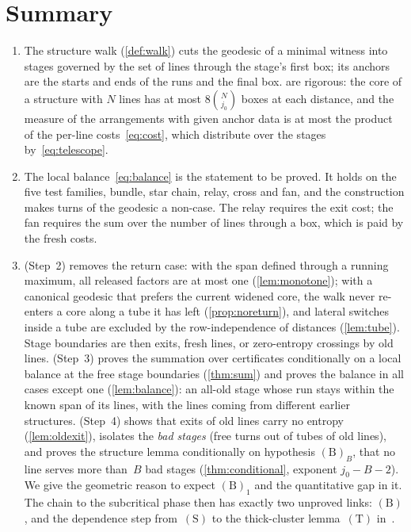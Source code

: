 \documentclass[11pt,letterpaper]{article}
\begin{document}
\section{Summary}
\label{sec:summary}

\begin{enumerate}
  \item The structure walk (\cref{def:walk}) cuts the geodesic of a minimal witness into stages governed by the set of lines through the stage's first box; its anchors are the starts and ends of the runs and the final box.  are rigorous: the core of a structure with $N$ lines has at most $8\binom N{j_0}$ boxes at each distance, and the measure of the arrangements with given anchor data is at most the product of the per-line costs~\eqref{eq:cost}, which distribute over the stages by~\eqref{eq:telescope}.
  \item The local balance~\eqref{eq:balance} is the statement to be proved. It holds on the five test families, bundle, star chain, relay, cross and fan, and the construction makes turns of the geodesic a non-case. The relay requires the exit cost; the fan requires the sum over the number of lines through a box, which is paid by the fresh costs.
  \item {} (Step~2) removes the return case: with the span defined through a running maximum, all released factors are at most one (\cref{lem:monotone}); with a canonical geodesic that prefers the current widened core, the walk never re-enters a core along a tube it has left (\cref{prop:noreturn}), and lateral switches inside a tube are excluded by the row-independence of distances (\cref{lem:tube}). Stage boundaries are then exits, fresh lines, or zero-entropy crossings by old lines.  (Step~3) proves the summation over certificates conditionally on a local balance at the free stage boundaries (\cref{thm:sum}) and proves the balance in all cases except one (\cref{lem:balance}): an all-old stage whose run stays within the known span of its lines, with the lines coming from different earlier structures.  (Step~4) shows that exits of old lines carry no entropy (\cref{lem:oldexit}), isolates the \emph{bad stages} (free turns out of tubes of old lines), and proves the structure lemma conditionally on hypothesis $\mathrm{(B)}_B$, that no line serves more than~$B$ bad stages (\cref{thm:conditional}, exponent $j_0-B-2$). We give the geometric reason to expect $\mathrm{(B)}_1$ and the quantitative gap in it. The chain to the subcritical phase then has exactly two unproved links: $\mathrm{(B)}$, and the dependence step from~$\mathrm{(S)}$ to the thick-cluster lemma~$\mathrm{(T)}$ in~\cite{FM26}.
\end{enumerate}
\end{document}
